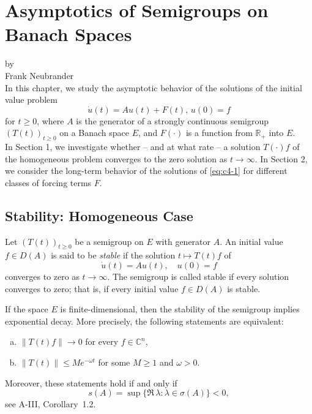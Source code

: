 \chapter{Asymptotics of Semigroups on Banach Spaces}\label{chap:a4}
{\Large
\vspace*{-.75cm}
by \\[.25em]
Frank Neubrander
\vspace{.75cm}
\\
}
In this chapter, we study the asymptotic behavior of the solutions of the initial value problem
\begin{equation}\label{eq:c4-1}
\dot{u}(t) = Au(t) + F(t), \, u(0) = f \tag{*}
\end{equation}
for $ t \geq 0 $, where $ A $ is the generator of a strongly continuous semigroup $ (T(t))_{t \geq 0} $ on a Banach space $ E $, and $ F(\cdot) $ is a function from $ \mathbb{R}_{+} $ into $ E $.\\
In Section 1, we investigate whether -- and at what rate -- a solution $ T(\cdot)f $ of the homogeneous problem converges to the zero solution as $ t \to \infty $. 
In Section 2, we consider the long-term behavior of the solutions of \eqref{eq:c4-1} for different classes of forcing terms $ F $.
\section{Stability: Homogeneous Case}\label{sec:c4-1}
Let $ (T(t))_{t \geq 0} $ be a semigroup on $ E $ with generator $ A $.
An initial value $ f \in D(A) $ is said to be \emph{stable} if the solution $ t \mapsto T(t)f $ of
\begin{equation}\label{eq:c4-2}
\dot{u}(t) = Au(t), \quad u(0) = f \tag{ACP}
\end{equation}
converges to zero as $ t \to \infty $. 
The semigroup is called stable if every solution converges to zero; that is, if every initial value $ f \in D(A) $ is stable.

If the space $ E $ is finite-dimensional, then the stability of the semigroup implies exponential decay. 
More precisely, the following statements are equivalent:
\begin{enumerate}[(a)]
\item 
$ \|T(t)f\| \to 0 $ for every $ f \in \mathbb{C}^{n} $,

\item 
$ \|T(t)\| \leq Me^{-\omega t} $ for some $M \geq 1$ and  $\omega > 0 $.
\end{enumerate}
Moreover, these statements hold if and only if
\[
s(A) = \sup\{\Re\,\lambda : \lambda \in \sigma(A)\} < 0,
\]
see A-III, Corollary~1.2.

